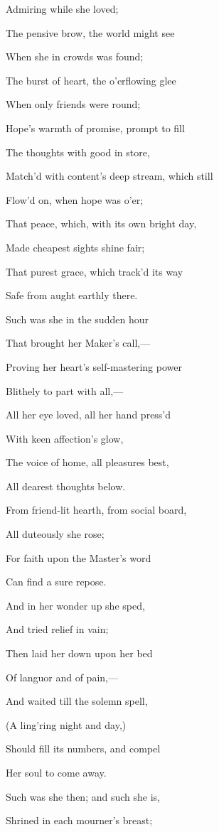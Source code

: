 Admiring while she loved;

The pensive brow, the world might see

When she in crowds was found;

The burst of heart, the o'erflowing glee

When only friends were round;

Hope's warmth of promise, prompt to fill

The thoughts with good in store,

Match'd with content's deep stream, which still

Flow'd on, when hope was o'er; 

That peace, which, with its own bright day,

Made cheapest sights shine fair;

That purest grace, which track'd its way

Safe from aught earthly there.

Such was she in the sudden hour

That brought her Maker's call,—

Proving her heart's self-mastering power

Blithely to part with all,—

All her eye loved, all her hand press'd

With keen affection's glow,

The voice of home, all pleasures best,

All dearest thoughts below.

From friend-lit hearth, from social board,

All duteously she rose;

For faith upon the Master's word

Can find a sure repose.

And in her wonder up she sped,

And tried relief in vain;

Then laid her down upon her bed

Of languor and of pain,— 

And waited till the solemn spell,

(A ling'ring night and day,)

Should fill its numbers, and compel

Her soul to come away.

Such was she then; and such she is,

Shrined in each mourner's breast;

